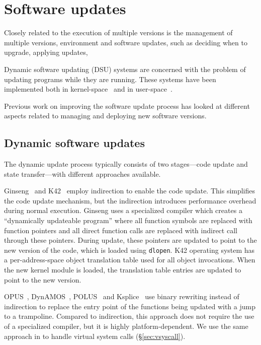 \section{Software updates}

Closely related to the execution of multiple versions is the management of
multiple versions, environment and software updates, such as deciding when to
upgrade, applying updates, \etc

Dynamic software updating (DSU) systems are concerned with the problem of
updating programs while they are running. These systems have been implemented
both in kernel-space~\cite{k42,dynamos,ksplice,proteos} and in
user-space~\cite{opus,ginseng,polus,upstare,ekiden,kitsune}.

Previous work on improving the software update process has looked at different
aspects related to managing and deploying new software versions.

\subsection{Dynamic software updates}

The dynamic update process typically consists of two stages---code update and
state transfer---with different approaches available.

Ginseng~\cite{ginseng} and K42~\cite{k42} employ indirection to enable the code
update. This simplifies the code update mechanism, but the indirection
introduces performance overhead during normal execution. Ginseng uses a
specialized compiler which creates a ``dynamically updateable program'' where
all function symbols are replaced with function pointers and all direct
function calls are replaced with indirect call through these pointers. During
update, these pointers are updated to point to the new version of the code,
which is loaded using \lstinline`dlopen`. K42 operating system has a
per-address-space object translation table used for all object invocations.
When the new kernel module is loaded, the translation table entries are updated
to point to the new version.

OPUS~\cite{opus}, DynAMOS~\cite{dynamos}, POLUS~\cite{polus} and
Ksplice~\cite{ksplice} use binary rewriting instead of indirection to replace
the entry point of the functions being updated with a jump to a trampoline.
Compared to indirection, this approach does not require the use of a
specialized compiler, but it is highly platform-dependent. We use the same
approach in \varan to handle virtual system calls (\S\ref{sec:vsyscall}).

